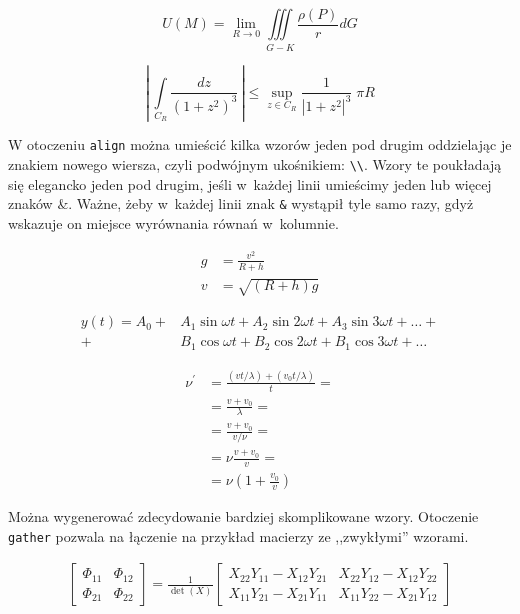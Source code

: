 \begin{equation}
    U(M) = \lim\limits_{R\to 0} \iiint\limits_{G-K}\frac{\rho(P)}{r}dG
\end{equation}

\begin{equation*}
    \left| \, \int\limits_{C_R} \frac{dz}{\left( 1+z^2 \right )^3} \, \right| \leqslant \sup\limits_{z \in C_R} \frac{1}{\left| 1+z^2 \right|^3} \; \pi R
\end{equation*}

W otoczeniu \texttt{align} można umieścić kilka wzorów jeden pod drugim oddzielając je znakiem nowego wiersza, czyli podwójnym ukośnikiem: \texttt{\textbackslash{}\textbackslash{}}. Wzory te poukładają się elegancko jeden pod drugim, jeśli w~każdej linii umieścimy jeden lub więcej znaków \&. Ważne, żeby w~każdej linii znak \texttt{\&} wystąpił tyle samo razy, gdyż wskazuje on miejsce wyrównania równań w~kolumnie.

\begin{align}
    g & = \frac{v^2}{R+h} \\
    v & = \sqrt{ \left( R+h \right) g }
\end{align}

\begin{align}
 y(t) = A_0 
 +& A_1 \sin \omega t + 
    A_2 \sin 2 \omega t + 
    A_3 \sin 3 \omega t + \ldots + \nonumber \\
 +& B_1 \cos \omega t + 
    B_2 \cos 2 \omega t + 
    B_1 \cos 3 \omega t + \ldots
\end{align}

\begin{align}
 \nu^\prime  &= \frac{\left(vt / \lambda \right) + \left( v_0t / \lambda \right)}{t} = \nonumber\\
            &= \frac{v + v_0}{\lambda} = \nonumber\\
            &= \frac{v + v_0}{v / \nu} = \nonumber\\
            &= \nu \frac{v+v_0}{v} = \nonumber\\
            &= \nu \left( 1 + \frac{v_0}{v} \right)
\end{align}

Można wygenerować zdecydowanie bardziej skomplikowane wzory. Otoczenie \texttt{gather} pozwala na łączenie na przykład macierzy ze ,,zwykłymi'' wzorami.

\begin{gather}
 \begin{bmatrix} \Phi_{11} & \Phi_{12} \\ \Phi_{21} & \Phi_{22} \end{bmatrix}
 =
 \frac{1}{\det(X)}
  \begin{bmatrix}
   X_{22} Y_{11} - X_{12} Y_{21} &
   X_{22} Y_{12} - X_{12} Y_{22} \\
   X_{11} Y_{21} - X_{21} Y_{11} &
   X_{11} Y_{22} - X_{21} Y_{12} 
   \end{bmatrix}
\end{gather}

